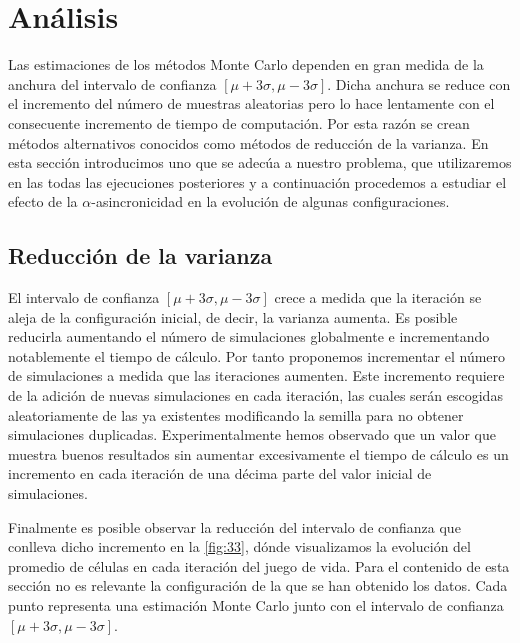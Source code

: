 \documentclass[../proyecto.tex]{memoir}
\begin{document}
\chapter{Análisis}

Las estimaciones de los métodos Monte Carlo dependen en gran medida de la anchura del intervalo de confianza $[\mu+3\sigma, \mu-3\sigma]$. Dicha anchura se reduce con el incremento del número de muestras aleatorias pero lo hace lentamente con el consecuente incremento de tiempo de computación. Por esta razón se crean métodos alternativos conocidos como métodos de reducción de la varianza. En esta sección introducimos uno que se adecúa a nuestro problema, que utilizaremos en las todas las ejecuciones posteriores y a continuación procedemos a estudiar el efecto de la $\alpha$-asincronicidad en la evolución de algunas configuraciones.

\section{Reducción de la varianza}

El intervalo de confianza $[\mu+3\sigma, \mu-3\sigma]$ crece a medida que la iteración se aleja de la configuración inicial, de decir, la varianza aumenta. Es posible reducirla aumentando el número de simulaciones globalmente e incrementando notablemente el tiempo de cálculo. Por tanto proponemos incrementar el número de simulaciones a medida que las iteraciones aumenten. Este incremento requiere de la adición de nuevas simulaciones en cada iteración, las cuales serán escogidas aleatoriamente de las ya existentes modificando la semilla para no obtener simulaciones duplicadas. Experimentalmente hemos observado que un valor que muestra buenos resultados sin aumentar excesivamente el tiempo de cálculo es un incremento en cada iteración de una décima parte del valor inicial de simulaciones. 

Finalmente es posible observar la reducción del intervalo de confianza que conlleva dicho incremento en la \autoref{fig:33}, dónde visualizamos la evolución del promedio de células en cada iteración del juego de vida. Para el contenido de esta sección no es relevante la configuración de la que se han obtenido los datos. Cada punto representa una estimación Monte Carlo junto con el intervalo de confianza $[\mu+3\sigma, \mu-3\sigma]$.
\end{document}
